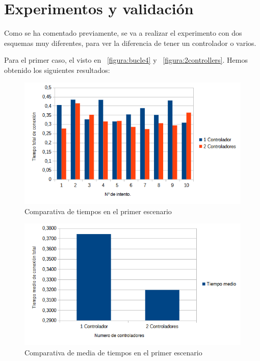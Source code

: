 \documentclass[a4paper, 12pt]{book}
\begin{document}
	
	\cleardoublepage
	\chapter{Experimentos y validación}
	\label{chap:experimentos}
	
	Como se ha comentado previamente, se va a realizar el experimento con dos esquemas muy diferentes, para ver la diferencia de tener un controlador o varios.
	
	Para el primer caso, el visto en ~\ref{figura:bucle4} y ~\ref{figura:2controllers}. Hemos obtenido los siguientes resultados:
	
	\begin{figure}
		\centering
		\includegraphics[width=16cm, keepaspectratio]{img/comparativabucle4}
		\caption{Comparativa de tiempos en el primer escenario}
		\label{figura:comparativabucle4}
	\end{figure}
	
	\begin{figure}
		\centering
		\includegraphics[width=16cm, keepaspectratio]{img/comparativamediasbucle}
		\caption{Comparativa de media de tiempos en el primer escenario}
		\label{figura:mediabucle4}
	\end{figure}
	
\end{document}
